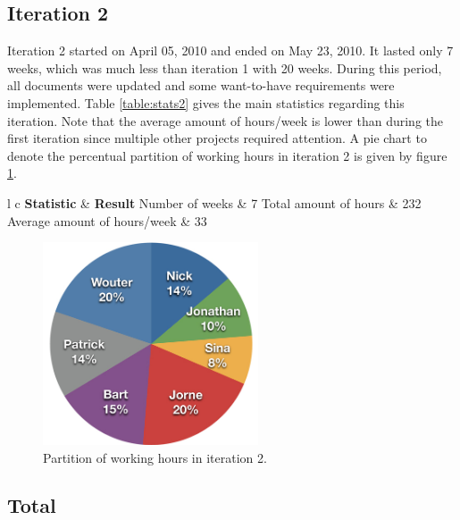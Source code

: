 \documentclass[salesmen, twoside]{../../../templates/latex/2009/softproj}
\begin{document}
\begin{projdoc}
			\subsection{Iteration 2}
			
			Iteration 2 started on April 05, 2010 and ended on May 23, 2010. It lasted only 7 weeks,
			which was much less than iteration 1 with 20 weeks. During this period, all documents were updated and some want-to-have requirements were implemented. Table \ref{table:stats2} gives the main statistics regarding this iteration. Note that the average amount of hours/week is lower than during the first iteration since multiple other projects required attention. A pie chart to denote the percentual partition of working hours in iteration 2 is given by figure \ref{fig:stats2}.
			
			\begin{table}
				\begin{center}
			\begin{tabular}{l c}
				\FL \textbf{Statistic} & \textbf{Result}
				\ML Number of weeks & 7
				\NN Total amount of hours  & 232
				\NN Average amount of hours/week & 33
			\end{tabular}
			\caption{General statistics for iteration 2: 05/04/10 - 23/05/10.}
			\label{table:stats2}
			\end{center}
			\end{table}
			
			\begin{figure}
				\begin{center}
				\includegraphics[height=6cm]{../../img/partition-2iter-total.jpg}
				\caption{Partition of working hours in iteration 2.}
				\label{fig:stats2}
				\end{center}
			\end{figure}
			
			\subsection{Total}
			

\end{projdoc}
\end{document}
